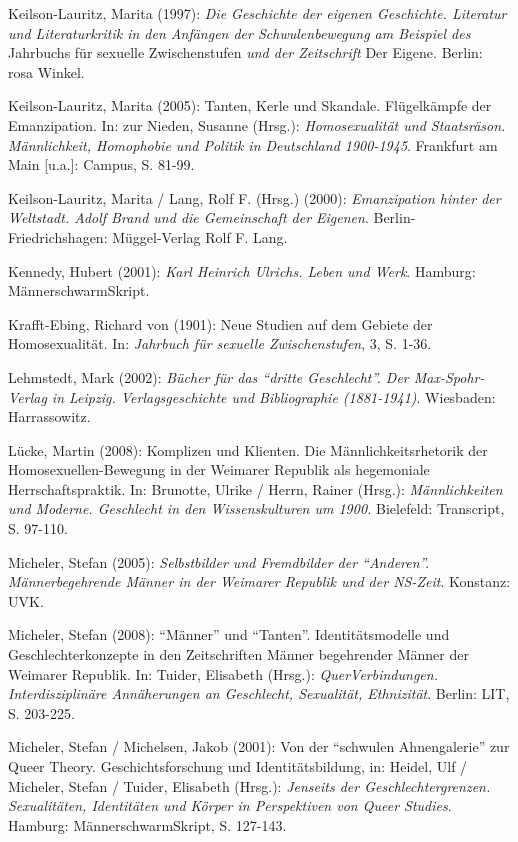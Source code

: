 \documentclass[a4paper,
fontsize=11pt,
oneside,
numbers=noperiodatend,
parskip=half-,
bibliography=totoc,
final
]{scrartcl}
\begin{document}
Keilson-Lauritz, Marita (1997): \emph{Die Geschichte der eigenen
Geschichte. Literatur und Literaturkritik in den Anfängen der
Schwulenbewegung am Beispiel des} Jahrbuchs für sexuelle Zwischenstufen
\emph{und der Zeitschrift} Der Eigene. Berlin: rosa Winkel.

Keilson-Lauritz, Marita (2005): Tanten, Kerle und Skandale. Flügelkämpfe
der Emanzipation. In: zur Nieden, Susanne (Hrsg.): \emph{Homosexualität
und Staatsräson. Männlichkeit, Homophobie und Politik in Deutschland
1900-1945}. Frankfurt am Main {[}u.a.{]}: Campus, S. 81-99.

Keilson-Lauritz, Marita / Lang, Rolf F. (Hrsg.) (2000):
\emph{Emanzipation hinter der Weltstadt. Adolf Brand und die
Gemeinschaft der Eigenen}. Berlin-Friedrichshagen: Müggel-Verlag Rolf F.
Lang.

Kennedy, Hubert (2001): \emph{Karl Heinrich Ulrichs.
Leben und Werk}. Hamburg: MännerschwarmSkript.

Krafft-Ebing, Richard von (1901): Neue Studien auf dem Gebiete der
Homosexualität. In: \emph{Jahrbuch für sexuelle Zwischenstufen}, 3, S.
1-36.

Lehmstedt, Mark (2002): \emph{Bücher für das \enquote{dritte
Geschlecht}. Der Max-Spohr-Verlag in Leipzig. Verlagsgeschichte und
Bibliographie (1881-1941)}. Wiesbaden: Harrassowitz.

Lücke, Martin (2008): Komplizen und Klienten. Die Männlichkeitsrhetorik
der Homosexuellen-Bewegung in der Weimarer Republik als hegemoniale
Herrschaftspraktik. In: Brunotte, Ulrike / Herrn, Rainer (Hrsg.):
\emph{Männlichkeiten und Moderne. Geschlecht in den Wissenskulturen um
1900.} Bielefeld: Transcript, S. 97-110.

Micheler, Stefan (2005): \emph{Selbstbilder und Fremdbilder der
\enquote{Anderen}. Männerbegehrende Männer in der Weimarer Republik und
der NS-Zeit}. Konstanz: UVK.

Micheler, Stefan (2008): \enquote{Männer} und \enquote{Tanten}.
Identitätsmodelle und Geschlechterkonzepte in den Zeitschriften Männer
begehrender Männer der Weimarer Republik. In: Tuider, Elisabeth (Hrsg.):
\emph{QuerVerbindungen. Interdisziplinäre Annäherungen an Geschlecht,
Sexualität, Ethnizität}. Berlin: LIT, S. 203-225.

Micheler, Stefan / Michelsen, Jakob (2001): Von der \enquote{schwulen
Ahnengalerie} zur Queer Theory. Geschichtsforschung und
Identitätsbildung, in: Heidel, Ulf / Micheler, Stefan / Tuider,
Elisabeth (Hrsg.): \emph{Jenseits der Geschlechtergrenzen. Sexualitäten,
Identitäten und Körper in Perspektiven von Queer Studies}. Hamburg:
MännerschwarmSkript, S. 127-143.
\end{document}
